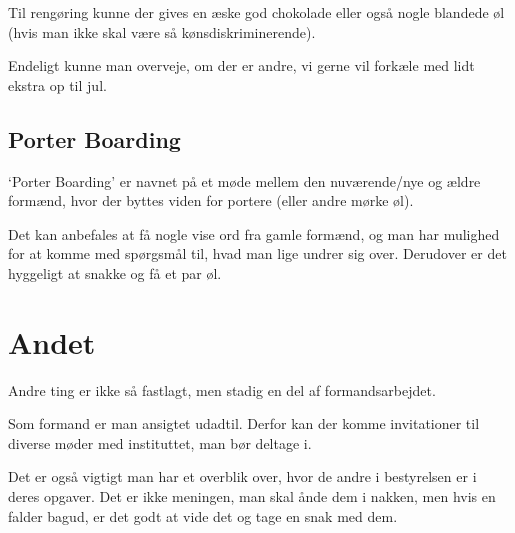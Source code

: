 Til rengøring kunne der gives en æske god chokolade eller også nogle
blandede øl (hvis man ikke skal være så kønsdiskriminerende).

Endeligt kunne man overveje, om der er andre, vi gerne vil forkæle med
lidt ekstra op til jul.

\subsection{Porter Boarding}
\label{sec:porter-boarding}

`Porter Boarding' er navnet på et møde mellem den nuværende/nye
og ældre formænd, hvor der byttes viden for portere (eller andre mørke
øl).

Det kan anbefales at få nogle vise ord fra gamle formænd, og man har
mulighed for at komme med spørgsmål til, hvad man lige undrer sig
over. Derudover er det hyggeligt at snakke og få et par øl.

\section{Andet}
\label{sec:andet}

Andre ting er ikke så fastlagt, men stadig en del af formandsarbejdet.

Som formand er man ansigtet udadtil. Derfor kan der komme invitationer
til diverse møder med instituttet, man bør deltage i.

Det er også vigtigt man har et overblik over, hvor de andre i
bestyrelsen er i deres opgaver. Det er ikke meningen, man skal ånde
dem i nakken, men hvis en falder bagud, er det godt at vide det og
tage en snak med dem.



